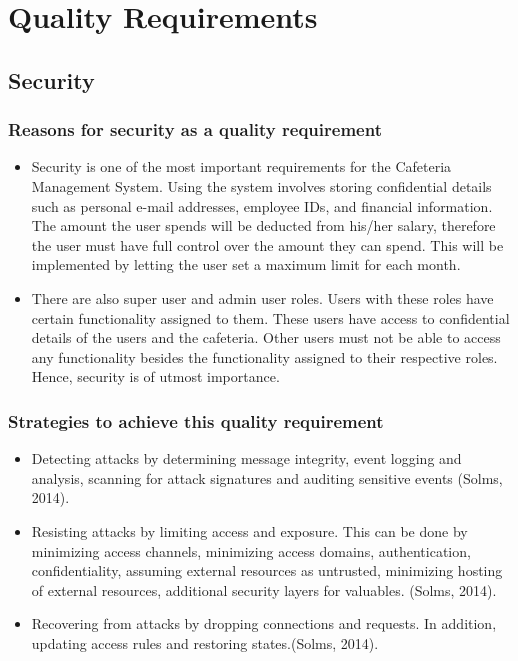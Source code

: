 \documentclass[a4paper,12pt]{article}
\begin{document}
\section{Quality Requirements}

\subsection{Security}

\subsubsection{Reasons for security as a quality requirement}
 \begin{itemize}
 \item Security is one of the most important requirements for the Cafeteria Management System. Using the system involves storing confidential details such as personal e-mail addresses, employee IDs, and financial information. The amount the user spends will be deducted from his/her salary, therefore the user must have full control over the amount they can spend. This will be implemented by letting the user set a maximum limit for each month.  
\item There are also super user and admin user roles. Users with these roles have certain functionality assigned to them. These users have access to confidential details of the users and the cafeteria. Other users must not be able to access any functionality besides the functionality assigned to their respective roles. Hence, security is of utmost importance.
 \end{itemize}

 \subsubsection{Strategies to achieve this quality requirement}
 \begin{itemize}
 \item Detecting attacks by determining message integrity, event logging and analysis, scanning for attack signatures and auditing sensitive events (Solms, 2014).
\item Resisting attacks by limiting access and exposure. This can be done by minimizing access channels, minimizing access domains, authentication, confidentiality, assuming external resources as untrusted, minimizing hosting of external resources, additional security layers for valuables. (Solms, 2014).
\item Recovering from attacks by dropping connections and requests. In addition, updating access rules and restoring states.(Solms, 2014).
 \end{itemize}
\end{document}
